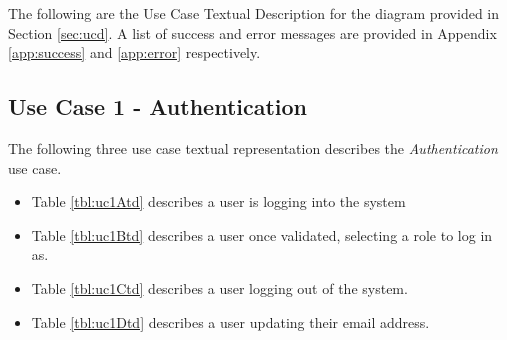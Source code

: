 \documentclass[fontsize=12pt,paper=letter,twoside]{scrartcl}
\begin{document}
The following are the Use Case Textual Description for the diagram provided in Section \ref{sec:ucd}. A list of success and error messages are provided in Appendix \ref{app:success} and \ref{app:error} respectively.
\newpage
\subsection{Use Case 1 - Authentication} \label{subsec:uc1}

The following three use case textual representation describes the \emph{Authentication} use case.


\begin{itemize}
\item Table \ref{tbl:uc1Atd} describes a user is logging into the system
\item Table \ref{tbl:uc1Btd} describes a user once validated, selecting a role to log in as.
\item Table \ref{tbl:uc1Ctd} describes a user logging out of the system.
\item Table \ref{tbl:uc1Dtd} describes a user updating their email address.
\end{itemize}
\end{document}

